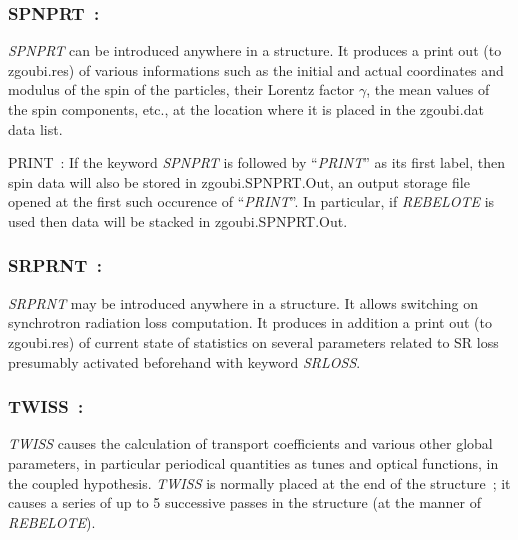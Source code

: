 {\newpage

\subsubsection{SPNPRT~: \SPNPRTTitl}\label{SPNPRT}
\medskip 

\noindent  \textsl{SPNPRT} can be introduced anywhere in a structure. It produces
a print out (to zgoubi.res) of various informations such as 
the initial and actual coordinates and modulus of the spin of the \IMAX{}
particles, their Lorentz factor $\gamma$, 
the mean values of the spin components, etc.,  at the location where it is placed in the zgoubi.dat data list.

\medskip


\bigskip

\noindent PRINT~: 
If the keyword \textsl{SPNPRT} is followed by ``\textsl{PRINT}'' as its first label, then spin data will also be stored in 
zgoubi.SPNPRT.Out, an output storage file opened at the first such occurence of ``\textsl{PRINT}''. In particular, if \textsl{REBELOTE} is used then data will be stacked in zgoubi.SPNPRT.Out. 



\newpage

\subsubsection{SRPRNT~: \SRPRNTTitl}\label{SRPRNT}
\medskip 

\noindent\textsl{SRPRNT} may be introduced anywhere in a structure. It allows switching on 
synchrotron radiation loss computation. It produces in addition 
a print out (to zgoubi.res) of current state of statistics on several parameters related to 
SR loss  presumably  activated beforehand with keyword \textsl{SRLOSS}. 



 \newpage


\subsubsection{TWISS~: \TWISSTitl}\label{TWISS} 
\medskip

\textsl{TWISS}   causes the calculation of 
  transport coefficients and various other global parameters, in particular 
periodical quantities as tunes and optical functions, in the coupled hypothesis.  
 \textsl{TWISS} is normally placed at the end of the structure~; it  causes a series 
of up to 5 successive passes in the structure (at the manner of \textsl{REBELOTE}). 

}
